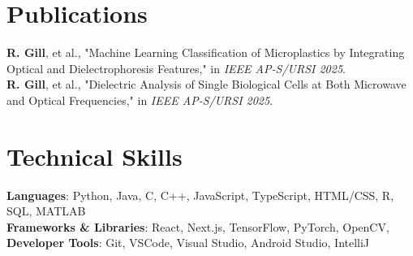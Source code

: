 \documentclass[letterpaper,11pt]{article}
\makeatletter
\newcommand{\resumeProjectHeading}[2]{
    \item
    \begin{tabular*}{0.97\textwidth}{l@{\extracolsep{\fill}}r}
      \small#1 & #2 \\
    \end{tabular*}\vspace{-7pt}
}
\newcommand{\resumeSubHeadingListStart}{\begin{itemize}[leftmargin=0.15in, label={}]}
\newcommand{\resumeSubHeadingListEnd}{\end{itemize}}
\makeatother
\begin{document}
    


\section{Publications}
\begin{itemize}[leftmargin=0.15in, label={}]
  \small{\item{
    \textbf{R. Gill}, et al., "Machine Learning Classification of Microplastics by Integrating Optical and Dielectrophoresis Features," in \textit{IEEE AP-S/URSI 2025}. \\
    \textbf{R. Gill}, et al., "Dielectric Analysis of Single Biological Cells at Both Microwave and Optical Frequencies," in \textit{IEEE AP-S/URSI 2025}. \\
  }}
\end{itemize}



\section{Technical Skills}
\begin{itemize}[leftmargin=0.15in, label={}]
  \small{\item{
  \textbf{Languages}{: Python, Java, C, C++, JavaScript, TypeScript, HTML/CSS, R, SQL, MATLAB} \\
  \textbf{Frameworks \& Libraries}{: React, Next.js, TensorFlow, PyTorch, OpenCV, } \\
  \textbf{Developer Tools}{: Git, VSCode, Visual Studio, Android Studio, IntelliJ} \\
  }}
\end{itemize}

\end{document}
